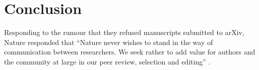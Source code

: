 \documentclass[letterpaper,twocolumn,superscriptaddress,showkeys]{revtex4}
\begin{document}
\section{Conclusion}


Responding to the rumour that they refused manuscripts submitted to arXiv,
Nature responded that ``Nature never wishes to stand in the way of communication
between researchers. We seek rather to add value for authors and the community
at large in our peer review, selection and editing'' \cite{nat05}.

\newpage


\end{document}
